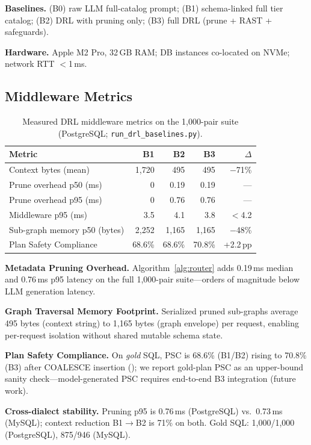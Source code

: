 \documentclass[twocolumn]{svjour3}
\begin{document}
\textbf{Baselines.} (B0) raw LLM full-catalog prompt; (B1) schema-linked full tier catalog; (B2) DRL with pruning only; (B3) full DRL (prune + RAST + safeguards).

\textbf{Hardware.} Apple M2 Pro, 32\,GB RAM; DB instances co-located on NVMe; network RTT $<$1\,ms.

\subsection{Middleware Metrics}

\begin{table}[t]
\centering
\caption{Measured DRL middleware metrics on the 1{,}000-pair suite (PostgreSQL; \texttt{run\_drl\_baselines.py}).}
\label{tab:middleware}
\small
\begin{tabular}{@{}lrrrr@{}}
\toprule
\textbf{Metric} & \textbf{B1} & \textbf{B2} & \textbf{B3} & \textbf{$\Delta$} \\
\midrule
Context bytes (mean) & 1{,}720 & 495 & 495 & $-$71\% \\
Prune overhead p50 (ms) & 0 & 0.19 & 0.19 & --- \\
Prune overhead p95 (ms) & 0 & 0.76 & 0.76 & --- \\
Middleware p95 (ms) & 3.5 & 4.1 & 3.8 & $<$4.2 \\
Sub-graph memory p50 (bytes) & 2{,}252 & 1{,}165 & 1{,}165 & $-$48\% \\
Plan Safety Compliance & 68.6\% & 68.6\% & 70.8\% & +2.2\,pp \\
\bottomrule
\end{tabular}
\end{table}

\textbf{Metadata Pruning Overhead.} Algorithm~\ref{alg:router} adds 0.19\,ms median and 0.76\,ms p95 latency on the full 1{,}000-pair suite---orders of magnitude below LLM generation latency.

\textbf{Graph Traversal Memory Footprint.} Serialized pruned sub-graphs average 495 bytes (context string) to 1{,}165 bytes (graph envelope) per request, enabling per-request isolation without shared mutable schema state.

\textbf{Plan Safety Compliance.} On \emph{gold} SQL, PSC is 68.6\% (B1/B2) rising to 70.8\% (B3) after COALESCE insertion (); we report gold-plan PSC as an upper-bound sanity check---model-generated PSC requires end-to-end B3 integration (future work).

\textbf{Cross-dialect stability.} Pruning p95 is 0.76\,ms (PostgreSQL) vs.\ 0.73\,ms (MySQL); context reduction B1$\rightarrow$B2 is 71\% on both.
Gold SQL: 1{,}000/1{,}000 (PostgreSQL), 875/946 (MySQL).
\end{document}
